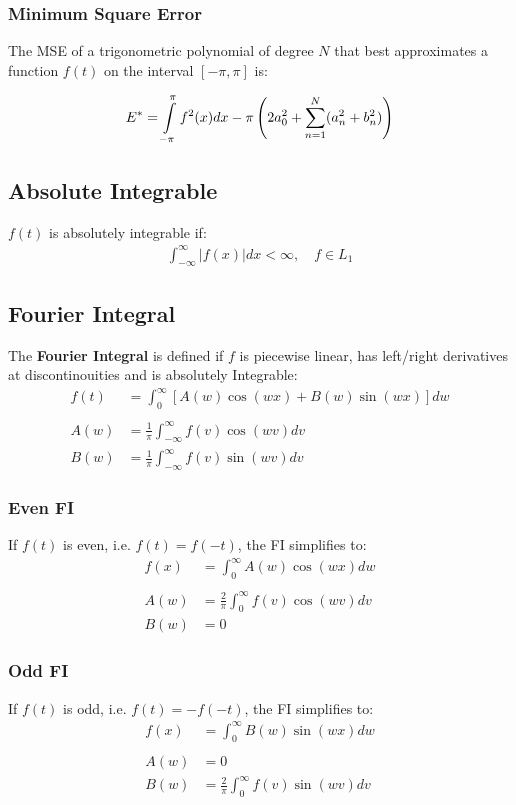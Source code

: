 \subsubsection{Minimum Square Error}
The MSE of a trigonometric polynomial of degree $N$ that best approximates a function $f(t)$ on the interval $[-\pi,\pi]$ is:

\begin{align*}
    E^*=\intop_{-\pi}^\pi f^2(x)dx-\pi\left(2a_0^2+\sum_{n=1}^N(a_n^2+b_n^2)\right)
\end{align*}

\subsection{Absolute Integrable}
$f(t)$ is absolutely integrable if:
\begin{align*}
    \int_{-\infty}^{\infty}\left|f(x)\right|dx<\infty ,\quad f\in L_1
\end{align*}
\subsection{Fourier Integral}
The \textbf{Fourier Integral} is defined if $f$ is piecewise linear, has left/right derivatives at
discontinouities and is absolutely Integrable:
\begin{align*}
    f(t) & =\int_0^\infty[A(w)\cos(wx)+B(w)\sin(wx)]dw     \\\\
    A(w) & =\frac1\pi\int_{-\infty}^{\infty}f(v)\cos(wv)dv \\
    B(w) & =\frac1\pi\int_{-\infty}^{\infty}f(v)\sin(wv)dv
\end{align*}

\subsubsection{Even FI}
If $f(t)$ is even, i.e. $f(t)=f(-t)$, the FI simplifies to:
\begin{align*}
    f(x) & =\int_0^\infty A(w)\cos(wx)dw          \\\\
    A(w) & =\frac2\pi\int_0^\infty f(v)\cos(wv)dv \\
    B(w) & =0
\end{align*}
\subsubsection{Odd FI}
If $f(t)$ is odd, i.e. $f(t)=-f(-t)$, the FI simplifies to:
\begin{align*}
    f(x) & =\int_0^\infty B(w)\sin(wx)dw          \\\\
    A(w) & =0                                     \\
    B(w) & =\frac2\pi\int_0^\infty f(v)\sin(wv)dv
\end{align*}

